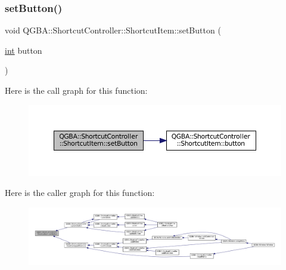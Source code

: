 \subsubsection{\texorpdfstring{set\+Button()}{setButton()}}
{\footnotesize\ttfamily void Q\+G\+B\+A\+::\+Shortcut\+Controller\+::\+Shortcut\+Item\+::set\+Button (\begin{DoxyParamCaption}\item[{\mbox{\hyperlink{ioapi_8h_a787fa3cf048117ba7123753c1e74fcd6}{int}}}]{button }\end{DoxyParamCaption})\hspace{0.3cm}{\ttfamily [inline]}}

Here is the call graph for this function\+:
\nopagebreak
\begin{figure}[H]
\begin{center}
\leavevmode
\includegraphics[width=350pt]{class_q_g_b_a_1_1_shortcut_controller_1_1_shortcut_item_a8eec996b81e389387c3a16cdf88ba7c9_cgraph}
\end{center}
\end{figure}
Here is the caller graph for this function\+:
\nopagebreak
\begin{figure}[H]
\begin{center}
\leavevmode
\includegraphics[width=350pt]{class_q_g_b_a_1_1_shortcut_controller_1_1_shortcut_item_a8eec996b81e389387c3a16cdf88ba7c9_icgraph}
\end{center}
\end{figure}
\mbox{\label{class_q_g_b_a_1_1_shortcut_controller_1_1_shortcut_item_a2fdd3769419d0f7c60ac9db85415a9dd}} 

